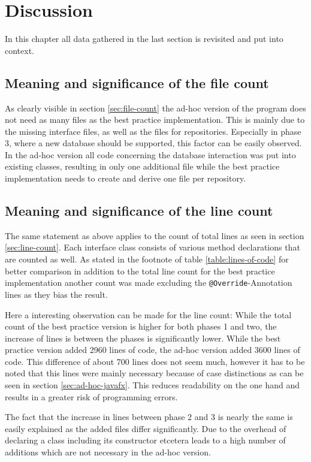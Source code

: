 \chapter{Discussion}
\label{sec:discussion}
In this chapter all data gathered in the last section is revisited and put into context. 
\section{Meaning and significance of the file count}
As clearly visible in section \ref{sec:file-count} the ad-hoc version of the program does not need as many files as the best practice implementation. This is mainly due to the missing interface files, as well as the files for repositories. Especially in phase 3, where a new database should be supported, this factor can be easily observed. In the ad-hoc version all code concerning the database interaction was put into existing classes, resulting in only one additional file while the best practice implementation needs to create and derive one file per repository. 

\section{Meaning and significance of the line count}
The same statement as above applies to the count of total lines as seen in section \ref{sec:line-count}. Each interface class consists of various method declarations that are counted as well. As stated in the footnote of table \ref{table:lines-of-code} for better comparison in addition to the total line count for the best practice implementation another count was made excluding the \texttt{@Override}-Annotation lines as they bias the result. 

Here a interesting observation can be made for the line count: While the total count of the best practice version is higher for both phases 1 and two, the increase of lines is between the phases is significantly lower. While the best practice version added 2960 lines of code, the ad-hoc version added 3600 lines of code. This difference of about 700 lines does not seem much, however it has to be noted that this lines were mainly necessary because of case distinctions as can be seen in section \ref{sec:ad-hoc-javafx}. This reduces readability on the one hand and results in a greater risk of programming errors. 

The fact that the increase in lines between phase 2 and 3 is nearly the same is easily explained as the added files differ significantly. Due to the overhead of declaring a class including its constructor etcetera leads to a high number of additions which are not necessary in the ad-hoc version.

